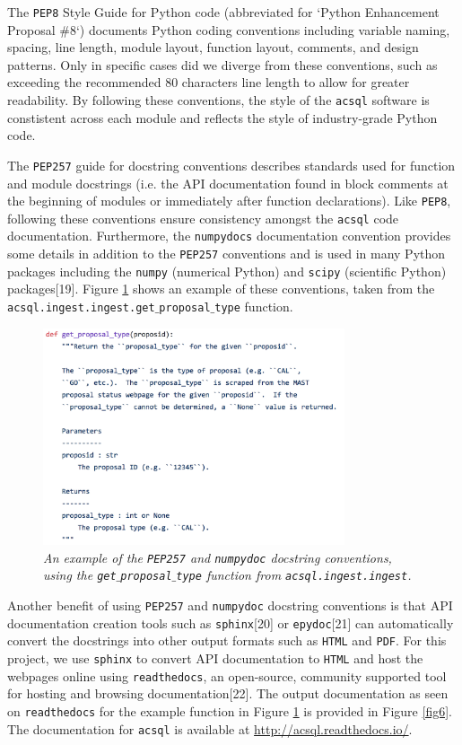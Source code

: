 \documentclass[10pt,journal,compsoc]{IEEEtran}
\begin{document}
The \texttt{PEP8} Style Guide for Python code (abbreviated for `Python Enhancement Proposal \#8`) documents Python coding conventions including variable naming, spacing,
line length, module layout, function layout, comments, and design patterns.  Only in specific cases did we diverge from these conventions, such as exceeding the recommended 80 characters line
length to allow for greater readability.  By following these conventions, the style of the \texttt{acsql} software is constistent across each module and reflects the style of
industry-grade Python code.

The \texttt{PEP257} guide for docstring conventions describes standards used for function and module docstrings (i.e. the API documentation found in block comments at the
beginning of modules or immediately after function declarations).  Like \texttt{PEP8}, following these conventions ensure consistency amongst the \texttt{acsql} code documentation.
Furthermore, the \texttt{numpydocs} documentation convention provides some details in addition to the \texttt{PEP257} conventions and is used in many Python packages including
the \texttt{numpy} (numerical Python) and \texttt{scipy} (scientific Python) packages[19].  Figure \ref{fig5} shows an example of these conventions, taken from the
\texttt{acsql.ingest.ingest.get$\_$proposal$\_$type} function.

\begin{figure}[!b]
\centering
\includegraphics[width=3.5in]{./figures/docstrings.png}
\caption{\textit{An example of the \texttt{PEP257} and \texttt{numpydoc} docstring conventions, using the \texttt{get$\_$proposal$\_$type} function from \texttt{acsql.ingest.ingest}.}}
\label{fig5}
\end{figure}

Another benefit of using \texttt{PEP257} and \texttt{numpydoc} docstring conventions is that API documentation creation tools such as \texttt{sphinx}[20] or \texttt{epydoc}[21] can
automatically convert the docstrings into other output formats such as \texttt{HTML} and \texttt{PDF}.  For this project, we use \texttt{sphinx} to convert API documentation to \texttt{HTML}
and host the webpages online using \texttt{readthedocs}, an open-source, community supported tool for hosting and browsing documentation[22]. The output documentation as seen on
\texttt{readthedocs} for the example function in Figure \ref{fig5} is provided in Figure \ref{fig6}. The documentation for \texttt{acsql} is available at
\textcolor{blue}{\url{http://acsql.readthedocs.io/}}.
\end{document}
